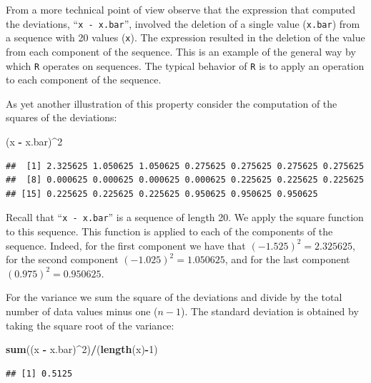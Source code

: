 \documentclass[]{krantz}
\makeatletter
\newenvironment{Shaded}{\begin{snugshade}}{\end{snugshade}}
\newcommand{\DecValTok}[1]{\textcolor[rgb]{0.00,0.00,0.81}{#1}}
\newcommand{\KeywordTok}[1]{\textcolor[rgb]{0.13,0.29,0.53}{\textbf{#1}}}
\newcommand{\NormalTok}[1]{#1}
\newcommand{\OperatorTok}[1]{\textcolor[rgb]{0.81,0.36,0.00}{\textbf{#1}}}
\newcommand{\StringTok}[1]{\textcolor[rgb]{0.31,0.60,0.02}{#1}}
\newenvironment{kframe}{%
\medskip{}
\setlength{\fboxsep}{.8em}
 \def\at@end@of@kframe{}%
 \ifinner\ifhmode%
  \def\at@end@of@kframe{\end{minipage}}%
  \begin{minipage}{\columnwidth}%
 \fi\fi%
 \def\FrameCommand##1{\hskip\@totalleftmargin \hskip-\fboxsep
 \colorbox{shadecolor}{##1}\hskip-\fboxsep
     \hskip-\linewidth \hskip-\@totalleftmargin \hskip\columnwidth}%
 \MakeFramed {\advance\hsize-\width
   \@totalleftmargin\z@ \linewidth\hsize
   \@setminipage}}%
 {\par\unskip\endMakeFramed%
 \at@end@of@kframe}
\renewenvironment{Shaded}{\begin{kframe}}{\end{kframe}}
\theoremstyle{definition}
\theoremstyle{definition}
\theoremstyle{definition}
\theoremstyle{remark}
\makeatother
\begin{document}
From a more technical point of view observe that the expression that
computed the deviations, ``\texttt{x\ -\ x.bar}'', involved the deletion of a
single value (\texttt{x.bar}) from a sequence with 20 values (\texttt{x}). The
expression resulted in the deletion of the value from each component of
the sequence. This is an example of the general way by which \texttt{R}
operates on sequences. The typical behavior of \texttt{R} is to apply an
operation to each component of the sequence.

As yet another illustration of this property consider the computation of
the squares of the deviations:

\begin{Shaded}
\begin{Highlighting}[]
\NormalTok{(x }\OperatorTok{-}\StringTok{ }\NormalTok{x.bar)}\OperatorTok{^}\DecValTok{2}
\end{Highlighting}
\end{Shaded}

\begin{verbatim}
##  [1] 2.325625 1.050625 1.050625 0.275625 0.275625 0.275625 0.275625
##  [8] 0.000625 0.000625 0.000625 0.000625 0.225625 0.225625 0.225625
## [15] 0.225625 0.225625 0.225625 0.950625 0.950625 0.950625
\end{verbatim}

Recall that ``\texttt{x\ -\ x.bar}'' is a sequence of length 20. We apply the
square function to this sequence. This function is applied to each of
the components of the sequence. Indeed, for the first component we have
that \((-1.525)^2 = 2.325625\), for the second component
\((-1.025)^2 = 1.050625\), and for the last component
\((0.975)^2 = 0.950625\).

For the variance we sum the square of the deviations and divide by the
total number of data values minus one (\(n-1\)). The standard deviation is
obtained by taking the square root of the variance:

\begin{Shaded}
\begin{Highlighting}[]
\KeywordTok{sum}\NormalTok{((x }\OperatorTok{-}\StringTok{ }\NormalTok{x.bar)}\OperatorTok{^}\DecValTok{2}\NormalTok{)}\OperatorTok{/}\NormalTok{(}\KeywordTok{length}\NormalTok{(x)}\OperatorTok{-}\DecValTok{1}\NormalTok{)}
\end{Highlighting}
\end{Shaded}

\begin{verbatim}
## [1] 0.5125
\end{verbatim}
\end{document}
